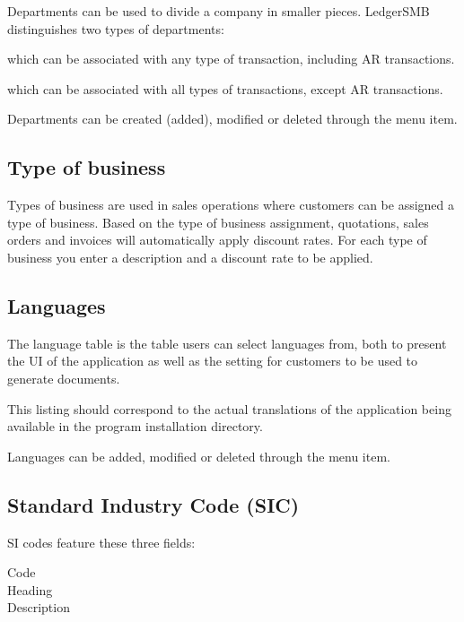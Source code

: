Departments can be used to divide a company in smaller pieces. LedgerSMB distinguishes two
types of departments:

\begin{description}[style=nextline]
\item [Profit centers] which can be associated with any type of transaction, including AR transactions.
\item [Cost centers] which can be associated with all types of transactions, except AR transactions.
\end{description}

Departments can be created (added), modified or deleted through the  menu item.

\subsection{Type of business}
\label{subsec-company-config-business-types}

Types of business are used in sales operations where customers can be assigned a type
of business. Based on the type of business assignment, quotations, sales orders and
invoices will automatically apply discount rates. For each type of business you enter a description and a discount rate to be applied.

\subsection{Languages}
\label{subsec-company-config-languages}

The language table is the table users can select languages from, both to present
the UI of the application as well as the setting for customers to be used to generate
documents.

This listing should correspond to the actual translations of the application being
available in the program installation directory.

Languages can be added, modified or deleted through the  menu item.

\subsection{Standard Industry Code (SIC)}
\label{subsec-company-config-sic}

SI codes feature these three fields:

\begin{description}
\item [Code]
\item [Heading]
\item [Description]
\end{description}

